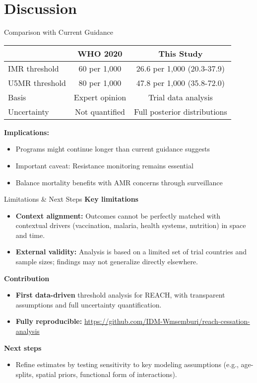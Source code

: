\documentclass[aspectratio=169]{beamer}\usepackage[]{graphicx}\usepackage[dvipsnames]{xcolor}
\begin{document}
\section{Discussion}

\begin{frame}{Comparison with Current Guidance}
\begin{center}
\begin{tabular}{lcc}
\toprule
& \textbf{WHO 2020} & \textbf{This Study} \\
\midrule
IMR threshold & 60 per 1,000 & 26.6 per 1,000 (20.3-37.9) \\
U5MR threshold & 80 per 1,000 & 47.8 per 1,000 (35.8-72.0) \\
Basis & Expert opinion & Trial data analysis \\
Uncertainty & Not quantified & Full posterior distributions \\
\bottomrule
\end{tabular}
\end{center}

\vspace{0.5cm}
\textbf{Implications:}
\begin{itemize}
  \item Programs might continue longer than current guidance suggests
  \item Important caveat: Resistance monitoring remains essential
  \item Balance mortality benefits with AMR concerns through surveillance
\end{itemize}
\end{frame}

\begin{frame}{Limitations \& Next Steps}
\textbf{Key limitations}
\begin{itemize}
  \item \textbf{Context alignment:} Outcomes cannot be perfectly matched with contextual drivers (vaccination, malaria, health systems, nutrition) in space and time.
  \item \textbf{External validity:} Analysis is based on a limited set of trial countries and sample sizes; findings may not generalize directly elsewhere.
\end{itemize}

\vspace{0.35em}
\textbf{Contribution}
\begin{itemize}
  \item \textbf{First data-driven} threshold analysis for REACH, with transparent assumptions and full uncertainty quantification.
  \item \textbf{Fully reproducible:} \url{https://github.com/IDM-Wmsemburi/reach-cessation-analysis}
\end{itemize}

\vspace{0.35em}
\textbf{Next steps}
\begin{itemize}
  \item Refine estimates by testing sensitivity to key modeling assumptions (e.g., age-splits, spatial priors, functional form of interactions).
\end{itemize}
\end{frame}
\end{document}
